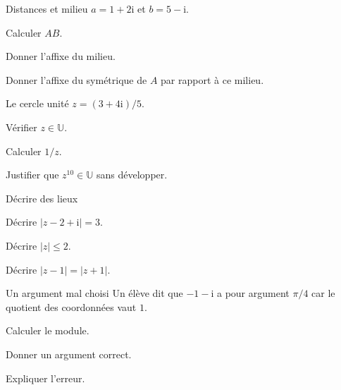 \begingroup\renewcommand{\otBesoinPlace}[1]{}\begin{minipage}{\linewidth}
\begin{exercice}[2]{Distances et milieu}
$a=1+2\mathrm i$ et $b=5-\mathrm i$.
\begin{questions}
\item Calculer $AB$.
\item Donner l’affixe du milieu.
\item Donner l’affixe du symétrique de $A$ par rapport à ce milieu.
\end{questions}
\end{exercice}
\begin{exercice}[2]{Le cercle unité}
$z=(3+4\mathrm i)/5$.
\begin{questions}
\item Vérifier $z\in\mathbb U$.
\item Calculer $1/z$.
\item Justifier que $z^{10}\in\mathbb U$ sans développer.
\end{questions}
\end{exercice}
\begin{exercice}[2]{Décrire des lieux}

\begin{questions}
\item Décrire $|z-2+\mathrm i|=3$.
\item Décrire $|z|\leq2$.
\item Décrire $|z-1|=|z+1|$.
\end{questions}
\end{exercice}
\begin{exercice}[2]{Un argument mal choisi}
Un élève dit que $-1-\mathrm i$ a pour argument $\pi/4$ car le quotient des coordonnées vaut $1$.
\begin{questions}
\item Calculer le module.
\item Donner un argument correct.
\item Expliquer l’erreur.
\end{questions}
\end{exercice}
\end{minipage}\endgroup
\clearpage
{}
